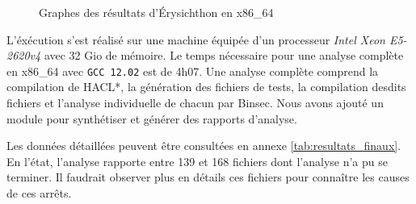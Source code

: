 \begin{figure}[!ht]
  \centering
  \caption{Graphes des résultats d'Érysichthon en x86\_64}
  \label{fig:graphe_total}
\end{figure}

L'éxécution s'est réalisé sur une machine équipée d'un processeur \textit{Intel Xeon E5-2620v4} avec 32 Gio de mémoire. Le temps nécessaire pour une analyse complète en x86\_64 avec \texttt{GCC 12.02} est de 4h07. Une analyse complète comprend la compilation de HACL*, la génération des fichiers de tests, la compilation desdits fichiers et l'analyse individuelle de chacun par Binsec. Nous avons ajouté un module pour synthétiser et générer des rapports d'analyse.\bigbreak

Les données détaillées peuvent être consultées en annexe \ref{tab:resultats_finaux}. En l'état, l'analyse rapporte entre 139 et 168 fichiers dont l'analyse n'a pu se terminer. Il faudrait observer plus en détails ces fichiers pour connaître les causes de ces arrêts. \medbreak

